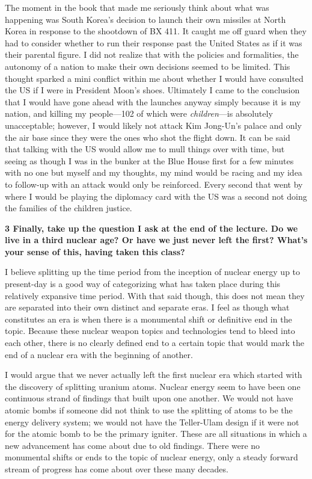 \documentclass[12pt]{turabian-researchpaper}
\newcommand\question[2]{\noindent\textbf{#1 \quad #2}}
\begin{document}
	The moment in the book that made me seriously think about what was happening was South Korea's decision to launch their own missiles at North Korea in response to the shootdown of BX 411. It caught me off guard when they had to consider whether to run their response past the United States as if it was their parental figure. I did not realize that with the policies and formalities, the autonomy of a nation to make their own decisions seemed to be limited. This thought sparked a mini conflict within me about whether I would have consulted the US if I were in President Moon's shoes. Ultimately I came to the conclusion that I would have gone ahead with the launches anyway simply because it is my nation, and killing my people—102 of which were \textit{children}—is absolutely unacceptable; however, I would likely not attack Kim Jong-Un's palace and only the air base since they were the ones who shot the flight down. It can be said that talking with the US would allow me to mull things over with time, but seeing as though I was in the bunker at the Blue House first for a few minutes with no one but myself and my thoughts, my mind would be racing and my idea to follow-up with an attack would only be reinforced. Every second that went by where I would be playing the diplomacy card with the US was a second not doing the families of the children justice.


\question{3}{ Finally, take up the question I ask at the end of the lecture. Do we live in a third nuclear age? Or have we just never left the first? What's your sense of this, having taken this class?}

	I believe splitting up the time period from the inception of nuclear energy up to present-day is a good way of categorizing what has taken place during this relatively expansive time period. With that said though, this does not mean they are separated into their own distinct and separate eras. I feel as though what constitutes an era is when there is a monumental shift or definitive end in the topic. Because these nuclear weapon topics and technologies tend to bleed into each other, there is no clearly defined end to a certain topic that would mark the end of a nuclear era with the beginning of another. 

	I would argue that we never actually left the first nuclear era which started with the discovery of splitting uranium atoms. Nuclear energy seem to have been one continuous strand of findings that built upon one another. We would not have atomic bombs if someone did not think to use the splitting of atoms to be the energy delivery system; we would not have the Teller-Ulam design if it were not for the atomic bomb to be the primary igniter. These are all situations in which a new advancement has come about due to old findings. There were no monumental shifts or ends to the topic of nuclear energy, only a steady forward stream of progress has come about over these many decades.
\end{document}
